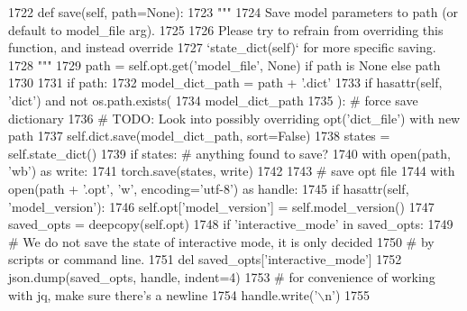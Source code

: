 \begin{DoxyCode}
1722     \textcolor{keyword}{def }save(self, path=None):
1723         \textcolor{stringliteral}{"""}
1724 \textcolor{stringliteral}{        Save model parameters to path (or default to model\_file arg).}
1725 \textcolor{stringliteral}{}
1726 \textcolor{stringliteral}{        Please try to refrain from overriding this function, and instead override}
1727 \textcolor{stringliteral}{        `state\_dict(self)` for more specific saving.}
1728 \textcolor{stringliteral}{        """}
1729         path = self.opt.get(\textcolor{stringliteral}{'model\_file'}, \textcolor{keywordtype}{None}) \textcolor{keywordflow}{if} path \textcolor{keywordflow}{is} \textcolor{keywordtype}{None} \textcolor{keywordflow}{else} path
1730 
1731         \textcolor{keywordflow}{if} path:
1732             model\_dict\_path = path + \textcolor{stringliteral}{'.dict'}
1733             \textcolor{keywordflow}{if} hasattr(self, \textcolor{stringliteral}{'dict'}) \textcolor{keywordflow}{and} \textcolor{keywordflow}{not} os.path.exists(
1734                 model\_dict\_path
1735             ):  \textcolor{comment}{# force save dictionary}
1736                 \textcolor{comment}{# TODO: Look into possibly overriding opt('dict\_file') with new path}
1737                 self.dict.save(model\_dict\_path, sort=\textcolor{keyword}{False})
1738             states = self.state\_dict()
1739             \textcolor{keywordflow}{if} states:  \textcolor{comment}{# anything found to save?}
1740                 with open(path, \textcolor{stringliteral}{'wb'}) \textcolor{keyword}{as} write:
1741                     torch.save(states, write)
1742 
1743                 \textcolor{comment}{# save opt file}
1744                 with open(path + \textcolor{stringliteral}{'.opt'}, \textcolor{stringliteral}{'w'}, encoding=\textcolor{stringliteral}{'utf-8'}) \textcolor{keyword}{as} handle:
1745                     \textcolor{keywordflow}{if} hasattr(self, \textcolor{stringliteral}{'model\_version'}):
1746                         self.opt[\textcolor{stringliteral}{'model\_version'}] = self.model\_version()
1747                     saved\_opts = deepcopy(self.opt)
1748                     \textcolor{keywordflow}{if} \textcolor{stringliteral}{'interactive\_mode'} \textcolor{keywordflow}{in} saved\_opts:
1749                         \textcolor{comment}{# We do not save the state of interactive mode, it is only decided}
1750                         \textcolor{comment}{# by scripts or command line.}
1751                         del saved\_opts[\textcolor{stringliteral}{'interactive\_mode'}]
1752                     json.dump(saved\_opts, handle, indent=4)
1753                     \textcolor{comment}{# for convenience of working with jq, make sure there's a newline}
1754                     handle.write(\textcolor{stringliteral}{'\(\backslash\)n'})
1755 
\end{DoxyCode}
